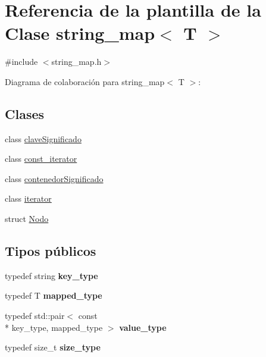 \hypertarget{classstring__map}{\section{Referencia de la plantilla de la Clase string\+\_\+map$<$ T $>$}
\label{classstring__map}
}


{\ttfamily \#include $<$string\+\_\+map.\+h$>$}



Diagrama de colaboración para string\+\_\+map$<$ T $>$\+:
\subsection*{Clases}
\begin{DoxyCompactItemize}
\item 
class \hyperlink{classstring__map_1_1claveSignificado}{clave\+Significado}
\item 
class \hyperlink{classstring__map_1_1const__iterator}{const\+\_\+iterator}
\item 
class \hyperlink{classstring__map_1_1contenedorSignificado}{contenedor\+Significado}
\item 
class \hyperlink{classstring__map_1_1iterator}{iterator}
\item 
struct \hyperlink{structstring__map_1_1Nodo}{Nodo}
\end{DoxyCompactItemize}
\subsection*{Tipos públicos}
\begin{DoxyCompactItemize}
\item 
\hypertarget{classstring__map_ac6b29d74d0658db5938f53b66394d2ca}{typedef string {\bfseries key\+\_\+type}}\label{classstring__map_ac6b29d74d0658db5938f53b66394d2ca}

\item 
\hypertarget{classstring__map_a87309fe41124ea0f9f9fe22729e1fdf7}{typedef T {\bfseries mapped\+\_\+type}}\label{classstring__map_a87309fe41124ea0f9f9fe22729e1fdf7}

\item 
\hypertarget{classstring__map_aba7d0f8b84310cf46a990b404834074b}{typedef std\+::pair$<$ const \\*
key\+\_\+type, mapped\+\_\+type $>$ {\bfseries value\+\_\+type}}\label{classstring__map_aba7d0f8b84310cf46a990b404834074b}

\item 
\hypertarget{classstring__map_a91a355e52de423b8385b72caf553e3de}{typedef size\+\_\+t {\bfseries size\+\_\+type}}\label{classstring__map_a91a355e52de423b8385b72caf553e3de}

\end{DoxyCompactItemize}
